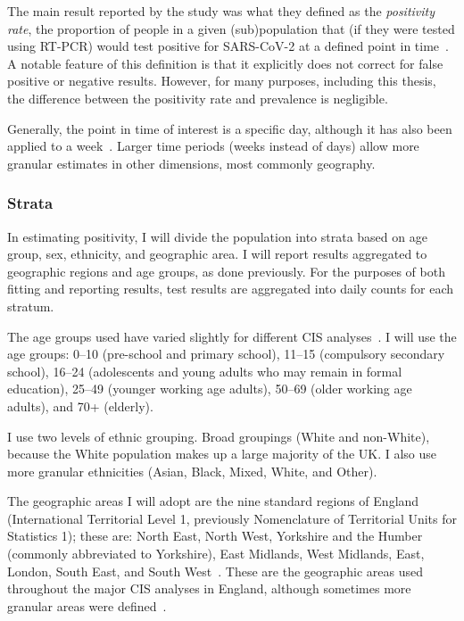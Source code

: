 \documentclass[thesis.tex]{subfiles}
\begin{document}
The main result reported by the study was what they defined as the \emph{positivity rate}, the proportion of people in a given (sub)population that (if they were tested using RT-PCR) would test positive for SARS-CoV-2 at a defined point in time~\autocite{cisMethodsONS}.
A notable feature of this definition is that it explicitly does not correct for false positive or negative results.
However, for many purposes, including this thesis, the difference between the positivity rate and prevalence is negligible.

Generally, the point in time of interest is a specific day, although it has also been applied to a week~\autocite{cisMethodsONS,pouwelsMRPvaccination,pouwelsCommunity}.
Larger time periods (\ie weeks instead of days) allow more granular estimates in other dimensions, most commonly geography.

\subsubsection{Strata} \label{biology-data:sec:cis-strata}

In estimating positivity, I will divide the population into strata based on age group, sex, ethnicity, and geographic area.
I will report results aggregated to geographic regions and age groups, as done previously.
For the purposes of both fitting and reporting results, test results are aggregated into daily counts for each stratum.

The age groups used have varied slightly for different CIS analyses~\autocite[e.g.][]{pouwelsMRPvaccination,pouwelsCommunity,cisMethodsONS,houseInferring,walkerTracking}.
I will use the age groups: 0--10 (pre-school and primary school), 11--15 (compulsory secondary school), 16--24 (adolescents and young adults who may remain in formal education), 25--49 (younger working age adults), 50--69 (older working age adults), and 70+ (elderly).

I use two levels of ethnic grouping.
Broad groupings (White and non-White), because the White population makes up a large majority of the UK.
I also use more granular ethnicities (Asian, Black, Mixed, White, and Other).

The geographic areas I will adopt are the nine standard regions of England (International Territorial Level 1, previously Nomenclature of Territorial Units for Statistics 1); these are: North East, North West, Yorkshire and the Humber (commonly abbreviated to Yorkshire), East Midlands, West Midlands, East, London, South East, and South West~\autocite{onsRegions}.
These are the geographic areas used throughout the major CIS analyses in England, although sometimes more granular areas were defined~\autocite[e.g.][]{pouwelsMRPvaccination,pouwelsCommunity,cisMethodsONS,houseInferring,walkerTracking}.
\end{document}
